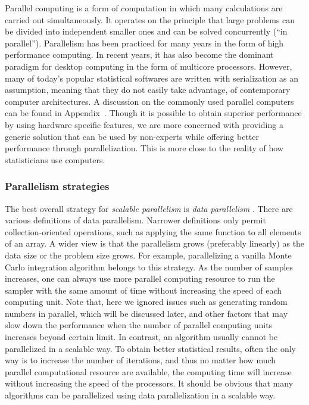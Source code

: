 Parallel computing is a form of computation in which many calculations are carried out simultaneously. It operates on the principle that large problems can be divided into independent smaller ones and can be solved concurrently (``in parallel''). Parallelism has been practiced for many years in the form of high performance computing. In recent years, it has also become the dominant paradigm for desktop computing in the form of multicore processors. However, many of today's popular statistical softwares are written with serialization as an assumption, meaning that they do not easily take advantage, of contemporary computer architectures. A discussion on the commonly used parallel computers can be found in Appendix~. Though it is possible to obtain superior performance by using hardware specific features, we are more concerned with providing a generic solution that can be used by non-experts while offering better performance through parallelization. This is more close to the reality of how statisticians use computers.

\subsubsection{Parallelism strategies}
\label{ssub:Parallelism strategies}

The best overall strategy for \emph{scalable parallelism} is \emph{data parallelism} \cite{datapar}. There are various definitions of data parallelism. Narrower definitions only permit collection-oriented operations, such as applying the same function to all elements of an array. A wider view is that the parallelism grows (preferably linearly) as the data size or the problem size grows. For example, parallelizing a vanilla Monte Carlo integration algorithm belongs to this strategy. As the number of samples increases, one can always use more parallel computing resource to run the sampler with the same amount of time without increasing the speed of each computing unit. Note that, here we ignored issues such as generating random numbers in parallel, which will be discussed later, and other factors that may slow down the performance when the number of parallel computing units increases beyond certain limit. In contrast, an \mcmc algorithm usually cannot be parallelized in a scalable way. To obtain better statistical results, often the only way is to increase the number of iterations, and thus no matter how much parallel computational resource are available, the computing time will increase without increasing the speed of the processors. It should be obvious that many \smc algorithms can be parallelized using data parallelization in a scalable way.

